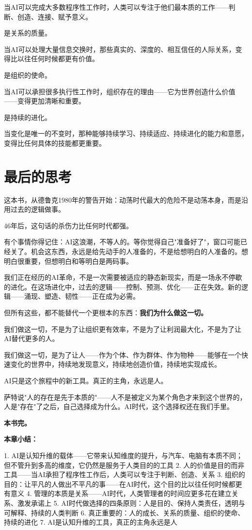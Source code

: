 当AI可以完成大多数程序性工作时，人类可以专注于他们最本质的工作——判断、创造、连接、赋予意义。

是关系的质量。

当AI可以处理大量信息交换时，那些真实的、深度的、相互信任的人际关系，变得比以往任何时候都更有价值。

是组织的使命。

当AI可以承担很多执行性工作时，组织存在的理由——它为世界创造什么价值——变得更加清晰和重要。

是持续的进化。

当变化是唯一的不变时，那种能够持续学习、持续适应、持续进化的能力和意愿，变得比任何具体的技能都更重要。

\section{最后的思考}


这本书，从德鲁克1980年的警告开始：动荡时代最大的危险不是动荡本身，而是沿用过去的逻辑做事。

46年后，这句话的杀伤力比任何时代都强。

有个事情你得记住：AI这浪潮，不等人的。等你觉得自己"准备好了"，窗口可能已经关了。机会这东西，永远是给先动手的人准备的，不是给想明白的人准备的。想明白很重要，但想明白和等明白是两码事。

我们正在经历的AI革命，不是一次需要被适应的静态新现实，而是一场永不停歇的进化。在这场进化中，过去的逻辑——控制、预测、优化——正在失效。新的逻辑——涌现、塑造、韧性——正在成为必需。

但所有这些，都不能替代一个更根本的东西：\textbf{我们为什么做这一切。}

我们做这一切，不是为了让组织更有效率，不是为了让利润最大化，不是为了让AI替代更多的人。

我们做这一切，是为了让人——作为个体、作为群体、作为物种——能够在一个快速变化的世界中，持续地发现意义，持续地创造价值，持续地实现成长。

AI只是这个旅程中的新工具。真正的主角，永远是人。

萨特说"人的存在是先于本质的"——人不是被定义为某个角色才来到这个世界的，人是"存在"了之后，自己选择成为什么。AI时代，这个选择权还在我们手里。


\textbf{本书完。}


\textbf{本章小结：}

1. AI是认知升维的载体——它带来认知维度的提升，与汽车、电脑有本质不同；但不管升到多高的维度，它仍然是服务于人类目的的工具
2. 人的价值是目的而非工具——当AI承担了程序性工作后，人类可以专注于判断、创造、关系
3. 组织的目的：让平凡的人做出不平凡的事——在AI时代，这个目的比以往任何时候都更有意义
4. 管理的本质是关系——AI时代，人类管理者的时间应更多花在建立关系、激发承诺上
5. AI时代做选择的四条原则：人是目的、保持人类责任，透明与可解释、持续的人类判断
6. 真正重要的：人的成长、关系的质量、组织的使命、持续的进化
7. AI是认知升维的工具，真正的主角永远是人
